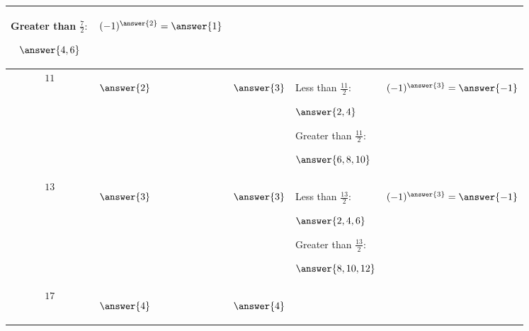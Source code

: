 \documentclass{ximera}
\begin{document}
\begin{br}
\begin{tabular}{c|p{1.5cm}|p{2.5cm}|p{7cm}|p{3cm}}
{                \\Greater than $\tfrac{7}{2}:$ \begin{prompt}
            $\answer{4,6}$\end{prompt}}
                & \begin{prompt}
            $(-1)^{\answer{2}}=\answer{1}$\end{prompt}\\\hline
        $11$ & \begin{prompt}
            $\answer{2}$\end{prompt}	& \begin{prompt}
            $\answer{3}$\end{prompt}
                & \makecell[l]{Less than $\tfrac{11}{2}:$ \begin{prompt}
            $\answer{2,4}$\end{prompt}
                \\Greater than $\tfrac{11}{2}:$ \begin{prompt}
            $\answer{6,8,10}$\end{prompt}}
                & \begin{prompt}
            $(-1)^{\answer{3}}=\answer{-1}$\end{prompt}\\\hline
        $13$ & \begin{prompt}
            $\answer{3}$\end{prompt}	& \begin{prompt}
            $\answer{3}$\end{prompt}
                & \makecell[l]{Less than $\tfrac{13}{2}:$ \begin{prompt}
            $\answer{2,4,6}$\end{prompt}
                \\Greater than $\tfrac{13}{2}:$ \begin{prompt}
            $\answer{8,10,12}$\end{prompt}}
                & \begin{prompt}
            $(-1)^{\answer{3}}=\answer{-1}$\end{prompt}\\\hline
        $17$ & \begin{prompt}
            $\answer{4}$\end{prompt}	& \begin{prompt}
            $\answer{4}$\end{prompt}
                & \makecell[l]{Less than $\tfrac{17}{2}:$ \begin{prompt}

\end{prompt}}
\end{tabular}
\end{br}
\end{document}
